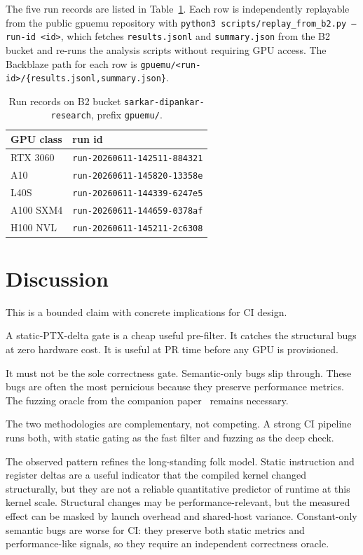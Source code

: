 \documentclass[runningheads]{llncs}
\begin{document}
The five run records are listed in Table~\ref{tab:runs}. Each row
is independently replayable from the public gpuemu repository with
\texttt{python3 scripts/replay\_from\_b2.py --run-id <id>}, which
fetches \texttt{results.jsonl} and \texttt{summary.json} from the
B2 bucket and re-runs the analysis scripts without requiring GPU
access. The Backblaze path for each row is
\texttt{gpuemu/<run-id>/\{results.jsonl,summary.json\}}.

\begin{table}[h]
\centering
\caption{Run records on B2 bucket
\texttt{sarkar-dipankar-research}, prefix \texttt{gpuemu/}.}
\label{tab:runs}
\begin{tabular}{ll}
\toprule
GPU class & run id \\
\midrule
RTX 3060   & \texttt{run-20260611-142511-884321} \\
A10        & \texttt{run-20260611-145820-13358e} \\
L40S       & \texttt{run-20260611-144339-6247e5} \\
A100 SXM4  & \texttt{run-20260611-144659-0378af} \\
H100 NVL   & \texttt{run-20260611-145211-2c6308} \\
\bottomrule
\end{tabular}
\end{table}

\section{Discussion}
\label{sec:discussion}

This is a bounded claim with concrete implications for CI design.

A static-PTX-delta gate is a cheap useful pre-filter. It catches the
structural bugs at zero hardware cost. It is useful at PR time before
any GPU is provisioned.

It must not be the sole correctness gate. Semantic-only bugs slip
through. These bugs are often the most pernicious because they
preserve performance metrics. The fuzzing oracle from the companion
paper~\cite{gpuemuP1} remains necessary.

The two methodologies are complementary, not competing. A strong CI
pipeline runs both, with static gating as the fast filter and fuzzing
as the deep check.

The observed pattern refines the long-standing folk model. Static
instruction and register deltas are a useful indicator that the
compiled kernel changed structurally, but they are not a reliable
quantitative predictor of runtime at this kernel scale. Structural
changes may be performance-relevant, but the measured effect can be
masked by launch overhead and shared-host variance. Constant-only
semantic bugs are worse for CI: they preserve both static metrics
and performance-like signals, so they require an independent
correctness oracle.
\end{document}
